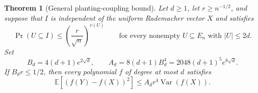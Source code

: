 \documentclass[11pt]{article}
\newcommand{\E}{\mathbb E}
\newcommand{\Var}{\operatorname{Var}}
\newcommand{\1}{\mathbf 1}
\newtheorem{theorem}{Theorem}[section]
\theoremstyle{definition}
\theoremstyle{remark}
\numberwithin{equation}{section}
\begin{document}
\begin{theorem}[General planting-coupling bound]\label{thm:coupling}
Let $d\ge1$, let $r\ge n^{-1/2}$, and suppose that $I$ is independent of the uniform Rademacher vector $X$ and satisfies
\begin{equation}\label{eq:general-mask}
 \Pr(U\subseteq I)\le\left(\frac r{\sqrt n}\right)^{v(U)}
 \qquad\text{for every nonempty }U\subseteq E_n
 \text{ with }|U|\le2d.
\end{equation}
Set
\[
 B_d=4(d+1)e^{2\sqrt d},\qquad
 A_d=8(d+1)B_d^4=2048(d+1)^5e^{8\sqrt d}.
\]
If $B_dr\le1/2$, then every polynomial $f$ of degree at most $d$ satisfies
\begin{equation}\label{eq:coupling}
 \E[(f(Y)-f(X))^2]\le A_dr^4\Var(f(X)).
\end{equation}
\end{theorem}
\end{document}
